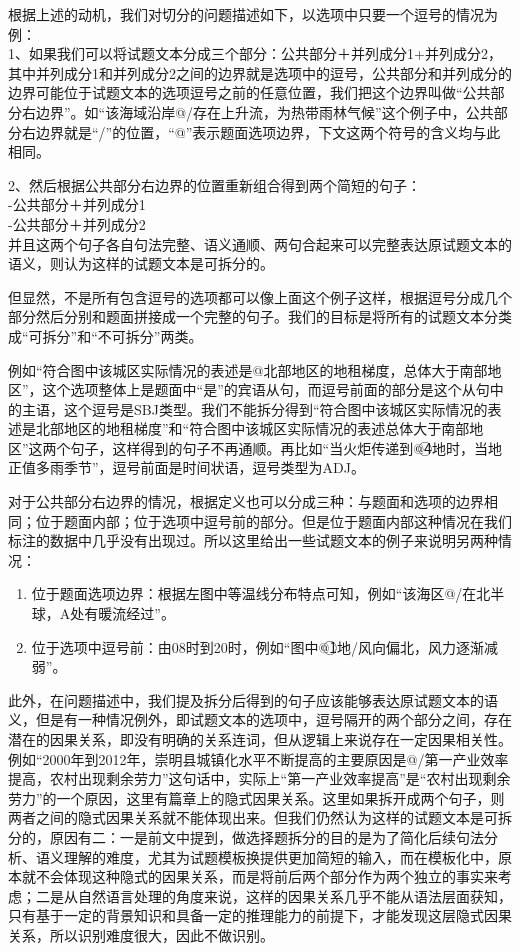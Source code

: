 \documentclass[master, winfont]{njuthesis}
\begin{document}
根据上述的动机，我们对切分的问题描述如下，以选项中只要一个逗号的情况为例：\\
1、如果我们可以将试题文本分成三个部分：公共部分＋并列成分1+并列成分2，其中并列成分1和并列成分2之间的边界就是选项中的逗号，公共部分和并列成分的边界可能位于试题文本的选项逗号之前的任意位置，我们把这个边界叫做“公共部分右边界”。如“该海域沿岸@/存在上升流，为热带雨林气候”这个例子中，公共部分右边界就是“/”的位置，“@”表示题面选项边界，下文这两个符号的含义均与此相同。

2、然后根据公共部分右边界的位置重新组合得到两个简短的句子：\\
-公共部分＋并列成分1\\
-公共部分＋并列成分2\\
并且这两个句子各自句法完整、语义通顺、两句合起来可以完整表达原试题文本的语义，则认为这样的试题文本是可拆分的。

但显然，不是所有包含逗号的选项都可以像上面这个例子这样，根据逗号分成几个部分然后分别和题面拼接成一个完整的句子。我们的目标是将所有的试题文本分类成“可拆分”和“不可拆分”两类。

例如“符合图中该城区实际情况的表述是@北部地区的地租梯度，总体大于南部地区”，这个选项整体上是题面中“是”的宾语从句，而逗号前面的部分是这个从句中的主语，这个逗号是SBJ类型。我们不能拆分得到“符合图中该城区实际情况的表述是北部地区的地租梯度”和“符合图中该城区实际情况的表述总体大于南部地区”这两个句子，这样得到的句子不再通顺。再比如“当火炬传递到@\textcircled{4}地时，当地正值多雨季节”，逗号前面是时间状语，逗号类型为ADJ。

对于公共部分右边界的情况，根据定义也可以分成三种：与题面和选项的边界相同；位于题面内部；位于选项中逗号前的部分。但是位于题面内部这种情况在我们标注的数据中几乎没有出现过。所以这里给出一些试题文本的例子来说明另两种情况：
\begin{enumerate}
  \item 位于题面选项边界：根据左图中等温线分布特点可知，例如“该海区@/在北半球，A处有暖流经过”。
  \item 位于选项中逗号前：由08时到20时，例如“图中@\textcircled{1}地/风向偏北，风力逐渐减弱”。
\end{enumerate}

此外，在问题描述中，我们提及拆分后得到的句子应该能够表达原试题文本的语义，但是有一种情况例外，即试题文本的选项中，逗号隔开的两个部分之间，存在潜在的因果关系，即没有明确的关系连词，但从逻辑上来说存在一定因果相关性。例如“2000年到2012年，崇明县城镇化水平不断提高的主要原因是@/第一产业效率提高，农村出现剩余劳力”这句话中，实际上“第一产业效率提高”是“农村出现剩余劳力”的一个原因，这里有篇章上的隐式因果关系\cite{liyancui2015}。这里如果拆开成两个句子，则两者之间的隐式因果关系就不能体现出来。但我们仍然认为这样的试题文本是可拆分的，原因有二：一是前文中提到，做选择题拆分的目的是为了简化后续句法分析、语义理解的难度，尤其为试题模板换提供更加简短的输入，而在模板化中，原本就不会体现这种隐式的因果关系，而是将前后两个部分作为两个独立的事实来考虑；二是从自然语言处理的角度来说，这样的因果关系几乎不能从语法层面获知，只有基于一定的背景知识和具备一定的推理能力的前提下，才能发现这层隐式因果关系，所以识别难度很大，因此不做识别。
\end{document}
